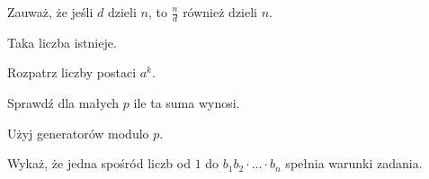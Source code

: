 
\begin{hints_list}
	\item Zauważ, że jeśli $d$ dzieli $n$, to $\frac{n}{d}$ również dzieli $n$.
	\item Taka liczba istnieje.
	\item Rozpatrz liczby postaci $a^k$.
	\item Sprawdź dla małych $p$ ile ta suma wynosi.
	\item Użyj generatorów modulo $p$.
	\item Wykaż, że jedna spośród liczb od $1$ do $b_1b_2\cdot ... \cdot b_n$ spełnia warunki zadania.
\end{hints_list}